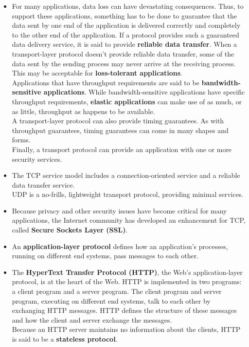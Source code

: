 \begin{itemize}
\item
For many applications, data loss can have devastating consequences. Thus, to support these applications, something has to be done to guarantee that the data sent by one end of the application is delivered correctly and completely to the other end of the application. If a protocol provides such a guaranteed data delivery service, it is said to provide \textbf{reliable data transfer}. When a transport-layer protocol doesn't provide reliable data transfer, some of the data sent by the sending process may never arrive at the receiving process. This may be acceptable for \textbf{loss-tolerant applications}.\\
Applications that have throughput requirements are said to be \textbf{bandwidth-sensitive applications}. While bandwidth-sensitive applications have specific throughput requirements, \textbf{elastic applications} can make use of as much, or as little, throughput as happens to be available.\\
A transport-layer protocol can also provide timing guarantees. As with throughput guarantees, timing guarantees can come in many shapes and forms.\\
Finally, a transport protocol can provide an application with one or more security services.

\item
The TCP service model includes a connection-oriented service and a reliable data transfer service.\\
UDP is a no-frills, lightweight transport protocol, providing minimal services.

\item
Because privacy and other security issues have become critical for many applications, the Internet community has developed an enhancement for TCP, called \textbf{Secure Sockets Layer (SSL)}.

\item
An \textbf{application-layer protocol} defines how an application's processes, running on different end systems, pass messages to each other.

\item
The \textbf{HyperText Transfer Protocol (HTTP)}, the Web's application-layer protocol, is at the heart of the Web. HTTP is implemented in two programs: a client program and a server program. The client program and server program, executing on different end systems, talk to each other by exchanging HTTP messages. HTTP defines the structure of these messages and how the client and server exchange the messages.\\
Because an HTTP server maintains no information about the clients, HTTP is said to be a \textbf{stateless protocol}.


\end{itemize}
